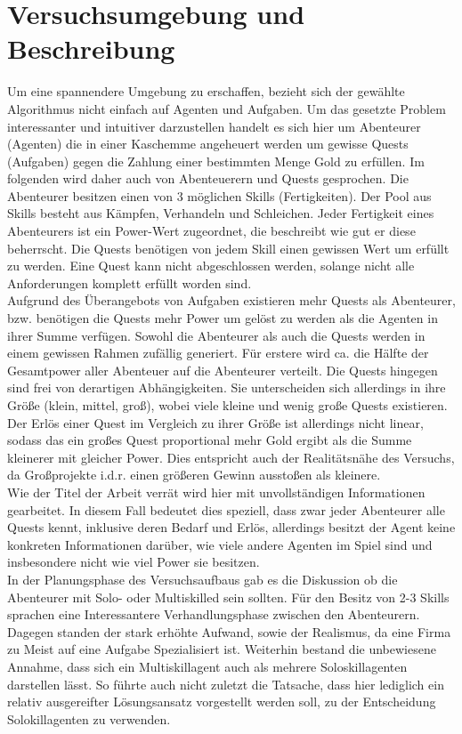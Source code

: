 \documentclass[fleqn,10pt]{SelfArx} %
\begin{document}

\section{Versuchsumgebung und Beschreibung}
\label{sec:Umgebung}

Um eine spannendere Umgebung zu erschaffen, bezieht sich der gewählte Algorithmus nicht einfach auf Agenten und Aufgaben. Um das gesetzte Problem interessanter und intuitiver darzustellen handelt es sich hier um Abenteurer (Agenten) die in einer Kaschemme angeheuert werden um gewisse Quests (Aufgaben) gegen die Zahlung einer bestimmten Menge Gold zu erfüllen. Im folgenden wird daher auch von Abenteuerern und Quests gesprochen. Die Abenteurer besitzen einen von 3 möglichen Skills (Fertigkeiten). Der Pool aus Skills besteht aus Kämpfen, Verhandeln und Schleichen. Jeder Fertigkeit eines Abenteurers ist ein Power-Wert zugeordnet, die beschreibt wie gut er diese beherrscht. Die Quests benötigen von jedem Skill einen gewissen Wert um erfüllt zu werden. Eine Quest kann nicht abgeschlossen werden, solange nicht alle Anforderungen komplett erfüllt worden sind.\\
Aufgrund des Überangebots von Aufgaben existieren mehr Quests als Abenteurer, bzw. benötigen die Quests mehr Power um gelöst zu werden als die Agenten in ihrer Summe verfügen. Sowohl die Abenteurer als auch die Quests werden in einem gewissen Rahmen zufällig generiert. Für erstere wird ca. die Hälfte der Gesamtpower aller Abenteuer auf die Abenteurer verteilt. Die Quests hingegen sind frei von derartigen Abhängigkeiten. Sie unterscheiden sich allerdings in ihre Größe (klein, mittel, groß), wobei viele kleine und wenig große Quests existieren. Der Erlös einer Quest im Vergleich zu ihrer Größe ist allerdings nicht linear, sodass das ein großes Quest proportional mehr Gold ergibt als die Summe kleinerer mit gleicher Power. Dies entspricht auch der Realitätsnähe des Versuchs, da Großprojekte i.d.r. einen größeren Gewinn ausstoßen als kleinere.\\
Wie der Titel der Arbeit verrät wird hier mit unvollständigen Informationen gearbeitet. In diesem Fall bedeutet dies speziell, dass zwar jeder Abenteurer alle Quests kennt, inklusive deren Bedarf und Erlös, allerdings besitzt der Agent keine konkreten Informationen darüber, wie viele andere Agenten im Spiel sind und insbesondere nicht wie viel Power sie besitzen.\\ 
In der Planungsphase des Versuchsaufbaus gab es die Diskussion ob die Abenteurer mit Solo- oder Multiskilled sein sollten. Für den Besitz von 2-3 Skills sprachen eine Interessantere Verhandlungsphase zwischen den Abenteurern. Dagegen standen der stark erhöhte Aufwand, sowie der Realismus, da eine Firma zu Meist auf eine Aufgabe Spezialisiert ist. Weiterhin bestand die unbewiesene Annahme, dass sich ein Multiskillagent auch als mehrere Soloskillagenten darstellen lässt. So führte auch nicht zuletzt die Tatsache, dass hier lediglich ein relativ ausgereifter Lösungsansatz vorgestellt werden soll, zu der Entscheidung Solokillagenten zu verwenden. \\
\end{document}
